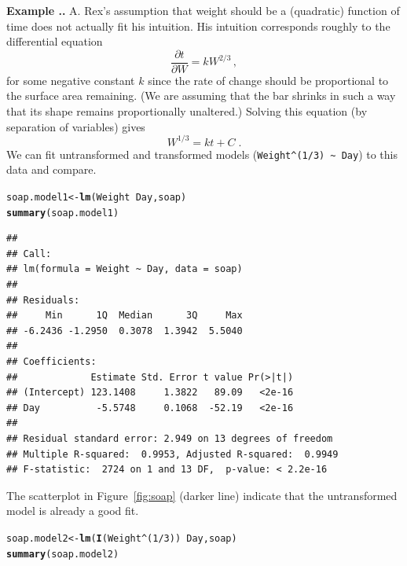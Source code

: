 \documentclass[twoside]{book}\usepackage[]{graphicx}\usepackage[]{xcolor}
\makeatletter
\newcommand{\hlnum}[1]{\textcolor[rgb]{0.686,0.059,0.569}{#1}}%
\newcommand{\hlopt}[1]{\textcolor[rgb]{0,0,0}{#1}}%
\newcommand{\hlstd}[1]{\textcolor[rgb]{0.345,0.345,0.345}{#1}}%
\newcommand{\hlkwb}[1]{\textcolor[rgb]{0.69,0.353,0.396}{#1}}%
\newcommand{\hlkwd}[1]{\textcolor[rgb]{0.737,0.353,0.396}{\textbf{#1}}}%
\newenvironment{kframe}{%
 \def\at@end@of@kframe{}%
 \ifinner\ifhmode%
  \def\at@end@of@kframe{\end{minipage}}%
  \begin{minipage}{\columnwidth}%
 \fi\fi%
 \def\FrameCommand##1{\hskip\@totalleftmargin \hskip-\fboxsep
 \colorbox{shadecolor}{##1}\hskip-\fboxsep
     \hskip-\linewidth \hskip-\@totalleftmargin \hskip\columnwidth}%
 \MakeFramed {\advance\hsize-\width
   \@totalleftmargin\z@ \linewidth\hsize
   \@setminipage}}%
 {\par\unskip\endMakeFramed%
 \at@end@of@kframe}
\newenvironment{knitrout}{}{} %
\newcommand{\Partial}[2]{\frac{\partial #1}{\partial #2}}
\def\answer{{\sf A. }}
\newcounter{example}[section]
\newenvironment{example}%
{\refstepcounter{example}%
\textbf{Example \thesection.\arabic{example}. }}%
{}
\makeatother
\begin{document}
\begin{example}
\answer
Rex's assumption that weight should be a (quadratic) function of time 
does not actually fit his intuition.  His intuition corresponds roughly to the 
differential equation
\[
\Partial{t}{W} = k W^{2/3}\,,
\]
for some negative constant $k$ since the rate of change should be 
proportional to the surface area remaining.  
(We are assuming that the bar shrinks in such a way 
that its shape remains proportionally unaltered.)
Solving this equation (by separation of variables) gives
\[
W^{1/3} = k t + C
\;.
\]
We can fit untransformed and transformed models 
(\verb!Weight^(1/3) ~ Day!) to this data and compare.
\begin{knitrout}
\color{fgcolor}\begin{kframe}
\begin{alltt}
\hlstd{soap.model1} \hlkwb{<-} \hlkwd{lm}\hlstd{(Weight} \hlopt{~} \hlstd{Day, soap)}
\hlkwd{summary}\hlstd{(soap.model1)}
\end{alltt}
\begin{verbatim}
## 
## Call:
## lm(formula = Weight ~ Day, data = soap)
## 
## Residuals:
##     Min      1Q  Median      3Q     Max 
## -6.2436 -1.2950  0.3078  1.3942  5.5040 
## 
## Coefficients:
##             Estimate Std. Error t value Pr(>|t|)
## (Intercept) 123.1408     1.3822   89.09   <2e-16
## Day          -5.5748     0.1068  -52.19   <2e-16
## 
## Residual standard error: 2.949 on 13 degrees of freedom
## Multiple R-squared:  0.9953,	Adjusted R-squared:  0.9949 
## F-statistic:  2724 on 1 and 13 DF,  p-value: < 2.2e-16
\end{verbatim}
\end{kframe}
\end{knitrout}
The scatterplot in Figure~\ref{fig:soap} 
(darker line) indicate that the untransformed model is already a good fit.
%
\begin{knitrout}
\color{fgcolor}\begin{kframe}
\begin{alltt}
\hlstd{soap.model2} \hlkwb{<-} \hlkwd{lm}\hlstd{(}\hlkwd{I}\hlstd{(Weight}\hlopt{^}\hlstd{(}\hlnum{1}\hlopt{/}\hlnum{3}\hlstd{))} \hlopt{~} \hlstd{Day, soap)}
\hlkwd{summary}\hlstd{(soap.model2)}
\end{alltt}
\begin{verbatim}

\end{verbatim}
\end{kframe}
\end{knitrout}
\end{example}
\end{document}
